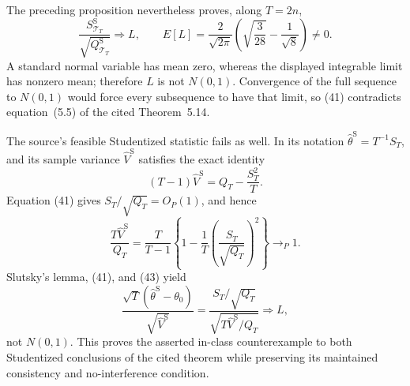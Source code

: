 The preceding proposition nevertheless proves, along \(T=2n\),
\[
 \frac{S_{\mathcal T_T}^{\mathrm S}}{\sqrt{Q_{\mathcal T_T}^{\mathrm S}}}
 \Longrightarrow L,
 \qquad
 E[L]=\frac2{\sqrt{2\pi}}
 \left(\sqrt{\frac3{28}}-\frac1{\sqrt8}\right)\ne0.
\tag{41}
\]
A standard normal variable has mean zero, whereas the displayed integrable limit has nonzero mean; therefore \(L\) is not \(N(0,1)\). Convergence of the full sequence to \(N(0,1)\) would force every subsequence to have that limit, so (41) contradicts equation~(5.5) of the cited Theorem~5.14.

The source's feasible Studentized statistic fails as well. In its notation \(\widehat\theta^{\mathrm S}=T^{-1}S_T\), and its sample variance \(\widehat V^{\mathrm S}\) satisfies the exact identity
\[
 (T-1)\widehat V^{\mathrm S}=Q_T-\frac{S_T^2}{T}.
\tag{42}
\]
Equation (41) gives \(S_T/\sqrt{Q_T}=O_P(1)\), and hence
\[
 \frac{T\widehat V^{\mathrm S}}{Q_T}
 =\frac{T}{T-1}\left\{1-
 \frac1T\left(\frac{S_T}{\sqrt{Q_T}}\right)^2\right\}
 \to_P1.
\tag{43}
\]
Slutsky's lemma, (41), and (43) yield
\[
 \frac{\sqrt T(\widehat\theta^{\mathrm S}-\theta_0)}{\sqrt{\widehat V^{\mathrm S}}}
 =\frac{S_T/\sqrt{Q_T}}{\sqrt{T\widehat V^{\mathrm S}/Q_T}}
 \Longrightarrow L,
\tag{44}
\]
not \(N(0,1)\). This proves the asserted in-class counterexample to both Studentized conclusions of the cited theorem while preserving its maintained consistency and no-interference condition.